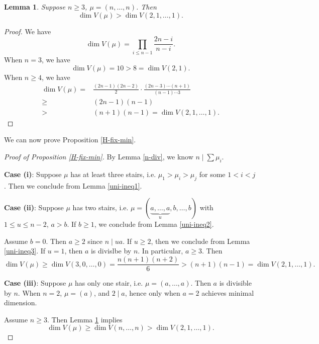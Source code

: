 \documentclass[a4paper]{amsart}
\theoremstyle{plain}
\newtheorem{lem}[thm]{Lemma}
\theoremstyle{remark} \newtheorem{remark}[thm]{Remark}
\theoremstyle{remark} \newtheorem{exercise}{Exercise}
\theoremstyle{remark} \newtheorem{example}{Example}
\numberwithin{equation}{section}
\begin{document}
\begin{lem}\label{uni-ineq4}
    Suppose $n\geqslant 3$, $\mu=(n,\ldots,n)$. Then
    \[\dim V(\mu)>\dim V(2,1,\ldots,1).\]
\end{lem}
\begin{proof}
    We have
    \[\dim V(\mu)=\prod_{i\leqslant n-1}\frac{2n-i}{n-i}.\]
    When $n=3$, we have
    \[\dim V(\mu)=10>8=\dim V(2,1).\]
    When $n\geqslant 4$, we have
    \begin{align*}
    \dim V(\mu)=&\frac{(2n-1)(2n-2)}{2}\cdot\frac{(2n-3)\cdots(n+1)}{(n-1)\cdots 3}\\
    \geqslant&(2n-1)(n-1)\\
    >&(n+1)(n-1)=\dim V(2,1,\ldots,1).
    \end{align*}
    
\end{proof}
    

We can now prove Proposition \ref{H-fix-min}.

\begin{proof}[Proof of Proposition \ref{H-fix-min}]
    By Lemma \ref{n-div}, we know $n\mid\sum\mu_i$. 
    
    \textbf{Case (i)}: Suppose $\mu$ has at least three stairs, i.e. $\mu_1>\mu_i>\mu_j$ for some $1<i<j$. Then we conclude from Lemma \ref{uni-ineq1}.

    \textbf{Case (ii)}: Suppose $\mu$ has two stairs, i.e. $\mu=(\underbrace{a,\ldots,a}_u,b,\ldots,b)$ with $1\leqslant u\leqslant n-2$, $a>b$. If $b\geqslant 1$, we conclude from Lemma \ref{uni-ineq2}. 
    
    Assume $b=0$. Then $a\geqslant 2$ since $n\mid ua$. If $u\geqslant 2$, then we conclude from Lemma \ref{uni-ineq3}. If $u=1$, then $a$ is divislbe by $n$. In particular, $a\geqslant 3$. Then
    \[\dim V(\mu)\geqslant \dim V(3,0,\ldots,0)=\frac{n(n+1)(n+2)}{6}>(n+1)(n-1)=\dim V(2,1,\ldots,1).\]

    \textbf{Case (iii)}: Suppose $\mu$ has only one stair, i.e. $\mu=(a,\ldots,a)$. Then $a$ is divisible by $n$. When $n=2$, $\mu=(a)$, and $2\mid a$, hence only when $a=2$ achieves minimal dimension.

    Assume $n\geqslant 3$. Then Lemma \ref{uni-ineq4} implies
    \[\dim V(\mu)\geqslant \dim V(n,\ldots,n)>\dim V(2,1,\ldots,1).\]
\end{proof}


\iffalse
\end{document}
